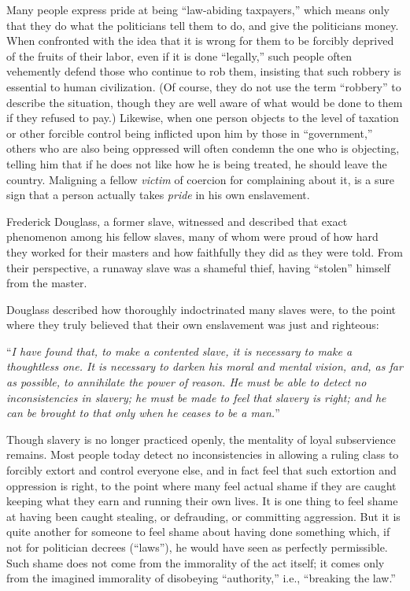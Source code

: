 \documentclass{book}
\begin{document}
Many people express pride at being \enquote{law-abiding taxpayers,} which means only that they do what the politicians tell them to do, and give the politicians money. When confronted with the idea that it is wrong for them to be forcibly deprived of the fruits of their labor, even if it is done \enquote{legally,} such people often vehemently defend those who continue to rob them, insisting that such robbery is essential to human civilization. (Of course, they do not use the term \enquote{robbery} to describe the situation, though they are well aware of what would be done to them if they refused to pay.) Likewise, when one person objects to the level of taxation or other forcible control being inflicted upon him by those in \enquote{government,} others who are also being oppressed will often condemn the one who is objecting, telling him that if he does not like how he is being treated, he should leave the country. Maligning a fellow \emph{victim} of coercion for complaining about it, is a sure sign that a person actually takes \emph{pride} in his own enslavement.

Frederick Douglass, a former slave, witnessed and described that exact phenomenon among his fellow slaves, many of whom were proud of how hard they worked for their masters and how faithfully they did as they were told. From their perspective, a runaway slave was a shameful thief, having \enquote{stolen} himself from the master.

Douglass described how thoroughly indoctrinated many slaves were, to the point where they truly believed that their own enslavement was just and righteous:

\enquote{\emph{I have found that, to make a contented slave, it is necessary to make a thoughtless one. It is necessary to darken his moral and mental vision, and, as far as possible, to annihilate the power of reason. He must be able to detect no inconsistencies in slavery; he must be made to feel that slavery is right; and he can be brought to that only when he ceases to be a man.}}

Though slavery is no longer practiced openly, the mentality of loyal subservience remains. Most people today detect no inconsistencies in allowing a ruling class to forcibly extort and control everyone else, and in fact feel that such extortion and oppression is right, to the point where many feel actual shame if they are caught keeping what they earn and running their own lives. It is one thing to feel shame at having been caught stealing, or defrauding, or committing aggression. But it is quite another for someone to feel shame about having done something which, if not for politician decrees (\enquote{laws}), he would have seen as perfectly permissible. Such shame does not come from the immorality of the act itself; it comes only from the imagined immorality of disobeying \enquote{authority,} i.e., \enquote{breaking the law.}
\end{document}
